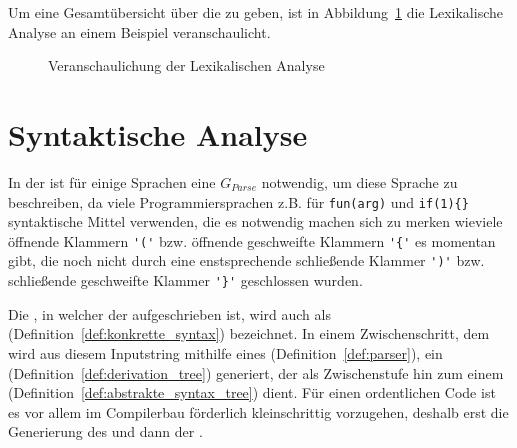 Um eine Gesamtübersicht über die  zu geben, ist in Abbildung~\ref{fig:lexikalische_analyse_veranschaulichung} die Lexikalische Analyse an einem Beispiel veranschaulicht.

\begin{figure}[H]
  \hfill

  \caption{Veranschaulichung der Lexikalischen Analyse}
  \label{fig:lexikalische_analyse_veranschaulichung}
\end{figure}

\section{Syntaktische Analyse}
In der  ist für einige Sprachen eine  $G_{Parse}$ notwendig, um diese Sprache zu beschreiben, da viele Programmiersprachen z.B. für  \verb|fun(arg)| und  \verb|if(1){}| syntaktische Mittel verwenden, die es notwendig machen sich zu merken wieviele öffnende Klammern \verb|'('| bzw. öffnende geschweifte Klammern \verb|'{'| es momentan gibt, die noch nicht durch eine enstsprechende schließende Klammer \verb|')'| bzw. schließende geschweifte Klammer \verb|'}'| geschlossen wurden.


Die , in welcher der  aufgeschrieben ist, wird auch als  (Definition~\ref{def:konkrette_syntax}) bezeichnet. In einem Zwischenschritt, dem  wird aus diesem Inputstring mithilfe eines  (Definition~\ref{def:parser}), ein  (Definition~\ref{def:derivation_tree}) generiert, der als Zwischenstufe hin zum einem  (Definition~\ref{def:abstrakte_syntax_tree}) dient. Für einen ordentlichen Code ist es vor allem im Compilerbau förderlich kleinschrittig vorzugehen, deshalb erst die Generierung des  und dann der .

